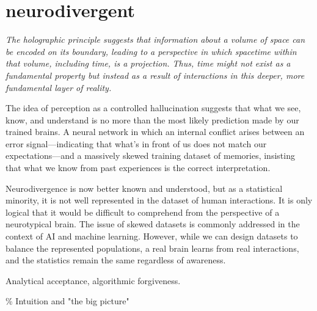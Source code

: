\chapter*{neurodivergent}
\begin{center}
\vspace{2cm}
\begin{flushright}
\large
\textit{The holographic principle suggests that information about a volume of space can be encoded on its boundary, leading to a perspective in which spacetime within that volume, including time, is a projection. Thus, time might not exist as a fundamental property but instead as a result of interactions in this deeper, more fundamental layer of reality.}
\end{flushright}
\vspace{2cm}
\end{center}
\normalsize

The idea of perception as a controlled hallucination suggests that what we see, know, and understand is no more than the most likely prediction made by our trained brains. A neural network in which an internal conflict arises between an error signal—indicating that what’s in front of us does not match our expectations—and a massively skewed training dataset of memories, insisting that what we know from past experiences is the correct interpretation.

Neurodivergence is now better known and understood, but as a statistical minority, it is not well represented in the dataset of human interactions. It is only logical that it would be difficult to comprehend from the perspective of a neurotypical brain. The issue of skewed datasets is commonly addressed in the context of AI and machine learning. However, while we can design datasets to balance the represented populations, a real brain learns from real interactions, and the statistics remain the same regardless of awareness.

Analytical acceptance, algorithmic forgiveness.

{\scriptsize \textcolor{comment}{\%  Intuition and "the big picture" }}

